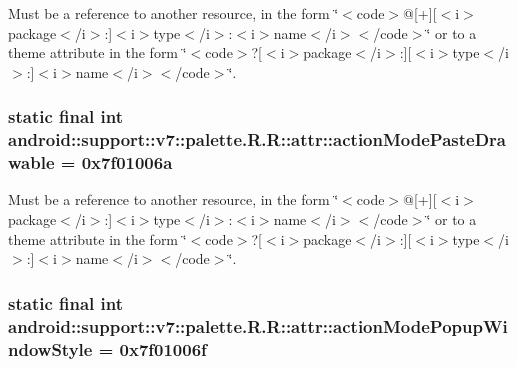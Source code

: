 Must be a reference to another resource, in the form \char`\"{}$<$code$>$@\mbox{[}+\mbox{]}\mbox{[}$<$i$>$package$<$/i$>$:\mbox{]}$<$i$>$type$<$/i$>$:$<$i$>$name$<$/i$>$$<$/code$>$\char`\"{} or to a theme attribute in the form \char`\"{}$<$code$>$?\mbox{[}$<$i$>$package$<$/i$>$:\mbox{]}\mbox{[}$<$i$>$type$<$/i$>$:\mbox{]}$<$i$>$name$<$/i$>$$<$/code$>$\char`\"{}. \hypertarget{classandroid_1_1support_1_1v7_1_1palette_1_1_r_1_1attr_596df82ace067d1d2968520d4108eb21}{
\subsubsection[{actionModePasteDrawable}]{\setlength{\rightskip}{0pt plus 5cm}static final int android::support::v7::palette.R.R::attr::actionModePasteDrawable = 0x7f01006a}}
\label{classandroid_1_1support_1_1v7_1_1palette_1_1_r_1_1attr_596df82ace067d1d2968520d4108eb21}


Must be a reference to another resource, in the form \char`\"{}$<$code$>$@\mbox{[}+\mbox{]}\mbox{[}$<$i$>$package$<$/i$>$:\mbox{]}$<$i$>$type$<$/i$>$:$<$i$>$name$<$/i$>$$<$/code$>$\char`\"{} or to a theme attribute in the form \char`\"{}$<$code$>$?\mbox{[}$<$i$>$package$<$/i$>$:\mbox{]}\mbox{[}$<$i$>$type$<$/i$>$:\mbox{]}$<$i$>$name$<$/i$>$$<$/code$>$\char`\"{}. \hypertarget{classandroid_1_1support_1_1v7_1_1palette_1_1_r_1_1attr_679ca51becf011b5ceacc9de375ad315}{
\subsubsection[{actionModePopupWindowStyle}]{\setlength{\rightskip}{0pt plus 5cm}static final int android::support::v7::palette.R.R::attr::actionModePopupWindowStyle = 0x7f01006f}}
\label{classandroid_1_1support_1_1v7_1_1palette_1_1_r_1_1attr_679ca51becf011b5ceacc9de375ad315}


